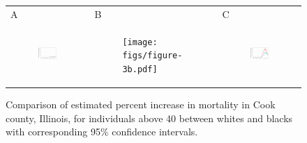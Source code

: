 \documentclass[11pt]{article}
\begin{document}
\begin{figure}[ht]
	\begin{tabular}{lll}
	A&B&C\\
	\begin{subfigure}[t]{0.3\linewidth}
		\centering
		\includegraphics[width=1\linewidth]{figs/figure-3a.pdf} 
	\end{subfigure}&
	\begin{subfigure}[t]{0.3\linewidth}
		\centering
		\texttt{[image: figs/figure-3b.pdf]}
	\end{subfigure}&
	\begin{subfigure}[t]{0.3\linewidth}
		\centering
		\includegraphics[width=1\linewidth]{figs/figure-3c.pdf}
	\end{subfigure}\\
	\end{tabular}
	\caption{Comparison of estimated percent increase in mortality in Cook county, Illinois, for individuals above 40 between whites and blacks with corresponding 95\% confidence intervals.}
	\label{fig:cook-white-v-black}
\end{figure}
\end{document}
